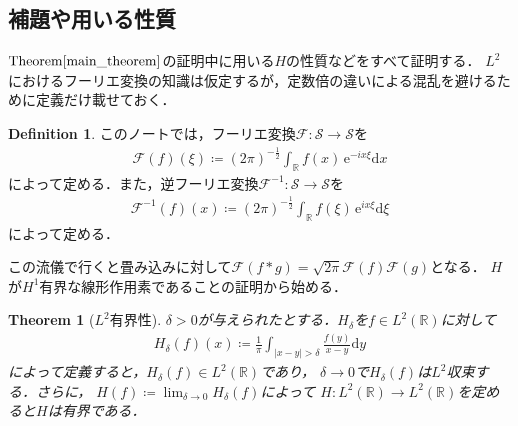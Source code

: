 \documentclass[dvipdfmx,autodetect-engine]{jsarticle}
\newtheorem{theorem}{Theorem}[section]
\theoremstyle{remark}
\theoremstyle{definition}
\newtheorem{definition}{Definition}[section]
\newcommand{\R}{\mathbb{R}}
\begin{document}
\subsection{補題や用いる性質}
$\mathrm{Theorem} \ref{main_theorem}$の証明中に用いる$H$の性質などをすべて証明する．
$L^2$におけるフーリエ変換の知識は仮定するが，定数倍の違いによる混乱を避けるために定義だけ載せておく．
\begin{definition}
    このノートでは，フーリエ変換$\mathcal{F} :\mathcal{S} \to \mathcal{S}$を
    \begin{align}
        \mathcal{F}(f)(\xi) \coloneqq (2\pi)^{-\frac{1}{2}} \int_{\R} f(x)\, \mathrm{e}^{-ix\xi} \mathrm{d}x
    \end{align}
    によって定める．また，逆フーリエ変換$\mathcal{F}^{-1} :\mathcal{S} \to \mathcal{S}$を
    \begin{align}
        \mathcal{F}^{-1} (f)(x) \coloneqq (2\pi)^{-\frac{1}{2}} \int_{\R} f(\xi)\, \mathrm{e}^{ix\xi} \mathrm{d}\xi
    \end{align}
    によって定める．
\end{definition}

この流儀で行くと畳み込みに対して$\mathcal{F}(f\ast g) = \sqrt{2\pi} \mathcal{F}(f) \mathcal{F}(g)$となる．
$H$が$H^1$有界な線形作用素であることの証明から始める．
\begin{theorem}[$L^2$有界性]
    $\delta >0$が与えられたとする．$H_{\delta}$を$f \in L^2 (\R)$に対して
    \begin{align}
        H_{\delta} (f) (x) \coloneqq \frac{1}{\pi} \int_{\lvert x-y \rvert > \delta} 
        \frac{f(y)}{x-y} \mathrm{d}y
    \end{align}
    によって定義すると，$H_{\delta}(f) \in L^2(\R)$であり，
    $\delta \to 0$で$H_{\delta}(f)$は$L^2$収束する．さらに，
    $H(f) \coloneqq \lim_{\delta \to 0} H_{\delta} (f)$によって
    $H:L^2(\R) \to L^2(\R)$を定めると$H$は有界である．
\end{theorem}
\end{document}

